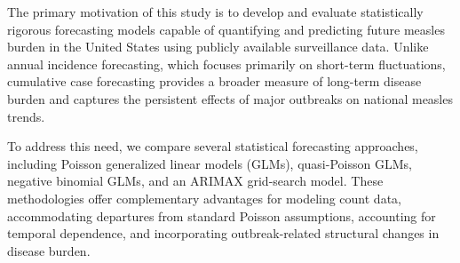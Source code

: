 \documentclass[utf8]{FrontiersinHarvard} %
\begin{document}
The primary motivation of this study is to develop and evaluate statistically rigorous forecasting models capable of quantifying and predicting future measles burden in the United States using publicly available surveillance data. Unlike annual incidence forecasting, which focuses primarily on short-term fluctuations, cumulative case forecasting provides a broader measure of long-term disease burden and captures the persistent effects of major outbreaks on national measles trends.

To address this need, we compare several statistical forecasting approaches, including Poisson generalized linear models (GLMs), quasi-Poisson GLMs, negative binomial GLMs, and an ARIMAX grid-search model. These methodologies offer complementary advantages for modeling count data, accommodating departures from standard Poisson assumptions, accounting for temporal dependence, and incorporating outbreak-related structural changes in disease burden.
\end{document}
